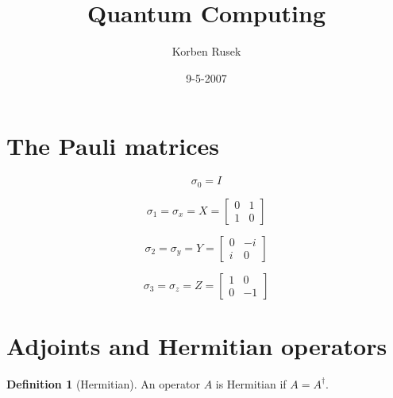 \documentclass{article}
\author{Korben Rusek}
\title{Quantum Computing}
\date{9-5-2007}
\begin{document}
\maketitle
\newcommand{\gindex}[2]{|#1\!:\!#2|}
\newcommand{\lcm}{\textrm{lcm}}
\newcommand{\irr}{\textrm{irr}}
\newcommand{\sylp}{$Syl_{p}$}
\newcommand{\phnt}[1]{$\phantom{1}^{#1}$}
\newcommand{\gen}[1]{\langle#1\rangle}
\newcommand{\BN}{\mathbb{N}}
\newcommand{\BZ}{\mathbb{Z}}
\newcommand{\BQ}{\mathbb{Q}}
\newcommand{\BR}{\mathbb{R}}
\newcommand{\BC}{\mathbb{C}}
\newcommand{\BF}{\mathbb{F}}
\newcommand{\CF}{\mathcal{F}}
\newcommand{\CQ}{\mathcal{Q}}
\newcommand{\fa}{\mathfrak{a}}
\newcommand{\fb}{\mathfrak{b}}
\newcommand{\fp}{\mathfrak{p}}
\newcommand{\fq}{\mathfrak{q}}
\newcommand{\fm}{\mathfrak{m}}
\newcommand{\FN}{\mathfrak{N}}
\newcommand{\FR}{\mathfrak{R}}
\newcommand{\set}[1]{\{#1\}}
\newcommand{\trv}{\set{1}}
\newcommand{\Aut}{\mathrm{Aut}}
\newcommand{\End}{\mathrm{End}}
\newcommand{\Ker}{\mathrm{Ker}}
\newcommand{\chr}{\mathrm{char}}
\theoremstyle{definition}
\newtheorem{theorem}{Theorem}[section]
\newtheorem{definition}[theorem]{Definition}


\section{The Pauli matrices}


\[
  \sigma_0=I
\]

\[
  \sigma_1=\sigma_x=X=
  \begin{bmatrix}
    0&1 \\
    1&0
  \end{bmatrix}
\]

\[
  \sigma_2=\sigma_y=Y=
  \begin{bmatrix}
    0&-i \\
    i&0
  \end{bmatrix}
\]

\[
  \sigma_3=\sigma_z=Z=
  \begin{bmatrix}
    1&0 \\
    0&-1
  \end{bmatrix}
\]

\section{Adjoints and Hermitian operators}

\begin{definition}[Hermitian]
  An operator $A$ is Hermitian if $A=A^\dagger$.
\end{definition}
\end{document}
